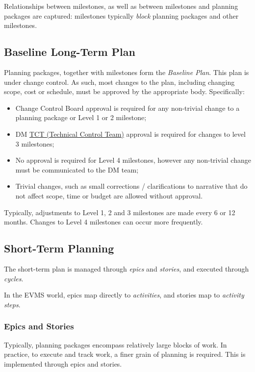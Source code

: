 \documentclass[DM,toc,obsolete]{lsstdoc}
\newcommand{\sphinxstyleemphasis}{\emph}
\begin{document}
Relationships between milestones, as well as between milestones and planning packages are captured:
milestones typically \sphinxstyleemphasis{block} planning packages and other milestones.


\subsection{Baseline Long-Term Plan}
\label{\detokenize{index:baseline-long-term-plan}}
Planning packages, together with milestones form the \sphinxstyleemphasis{Baseline Plan}.
This plan is under change control.
As such, most changes to the plan, including changing scope, cost or schedule, must be approved by the appropriate body.
Specifically:
\begin{itemize}
\item {}
Change Control Board approval is required for any non-trivial change to a planning package or Level 1 or 2 milestone;

\item {}
DM \href{https://confluence.lsstcorp.org/display/DM/Technical+Control+Team}{TCT (Technical Control Team)} approval is required for changes to level 3 milestones;

\item {}
No approval is required for Level 4 milestones, however any non-trivial change must be communicated to the DM team;

\item {}
Trivial changes, such as small corrections / clarifications to narrative that do not affect scope, time or budget are allowed without approval.

\end{itemize}

Typically, adjustments to Level 1, 2 and 3 milestones are made every 6 or 12 months. Changes to Level 4
milestones can occur more frequently.


\subsection{Short-Term Planning}
\label{\detokenize{index:short-term-planning}}
The short-term plan is managed through \sphinxstyleemphasis{epics} and \sphinxstyleemphasis{stories}, and executed through \sphinxstyleemphasis{cycles}.

In the EVMS world, epics map directly to \sphinxstyleemphasis{activities}, and stories map to \sphinxstyleemphasis{activity steps}.


\subsubsection{Epics and Stories}
\label{\detokenize{index:epics-and-stories}}
Typically, planning packages encompass relatively large blocks of work.  In practice, to execute and track
work, a finer grain of planning is required. This is implemented through epics and stories.
\end{document}
